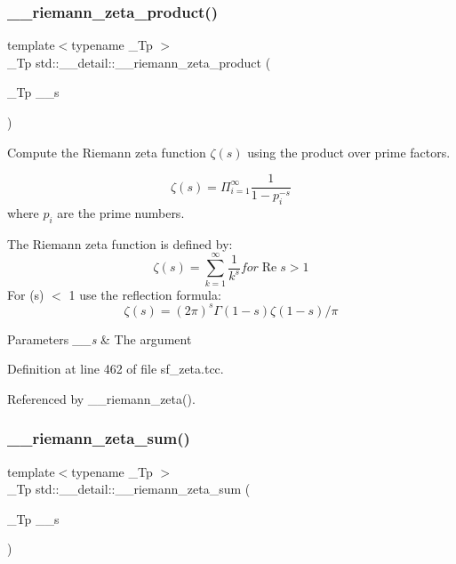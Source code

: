 \subsubsection{\texorpdfstring{\+\_\+\+\_\+riemann\+\_\+zeta\+\_\+product()}{\_\_riemann\_zeta\_product()}}
{\footnotesize\ttfamily template$<$typename \+\_\+\+Tp $>$ \\
\+\_\+\+Tp std\+::\+\_\+\+\_\+detail\+::\+\_\+\+\_\+riemann\+\_\+zeta\+\_\+product (\begin{DoxyParamCaption}\item[{\+\_\+\+Tp}]{\+\_\+\+\_\+s }\end{DoxyParamCaption})}



Compute the Riemann zeta function $ \zeta(s) $ using the product over prime factors. 

\[ \zeta(s) = \Pi_{i=1}^\infty \frac{1}{1 - p_i^{-s}} \] where $ {p_i} $ are the prime numbers.

The Riemann zeta function is defined by\+: \[ \renewcommand\Re{\operatorname{Re}} \renewcommand\Im{\operatorname{Im}} \zeta(s) = \sum_{k=1}^{\infty} \frac{1}{k^{s}} for \Re{s} > 1 \] For (s) $<$ 1 use the reflection formula\+: \[ \zeta(s) = (2\pi)^s \Gamma(1-s) \zeta(1-s) / \pi \]


\begin{DoxyParams}{Parameters}
{\em \+\_\+\+\_\+s} & The argument \\
\hline
\end{DoxyParams}


Definition at line 462 of file sf\+\_\+zeta.\+tcc.



Referenced by \+\_\+\+\_\+riemann\+\_\+zeta().

\mbox{\label{namespacestd_1_1____detail_a417dc216465f02bb7ef055fa0e4e1f0b}} 
\subsubsection{\texorpdfstring{\+\_\+\+\_\+riemann\+\_\+zeta\+\_\+sum()}{\_\_riemann\_zeta\_sum()}}
{\footnotesize\ttfamily template$<$typename \+\_\+\+Tp $>$ \\
\+\_\+\+Tp std\+::\+\_\+\+\_\+detail\+::\+\_\+\+\_\+riemann\+\_\+zeta\+\_\+sum (\begin{DoxyParamCaption}\item[{\+\_\+\+Tp}]{\+\_\+\+\_\+s }\end{DoxyParamCaption})}




